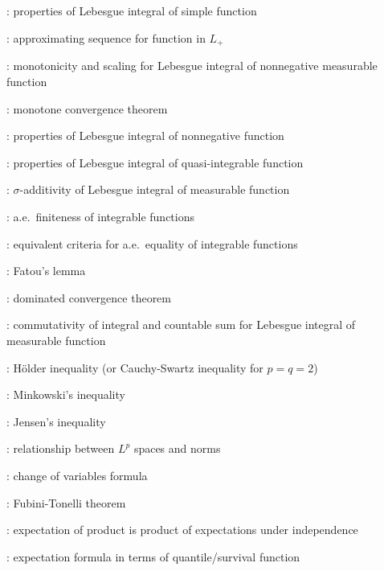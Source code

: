\subsection*{}
\item {}: properties of Lebesgue integral of simple function
\item {}: approximating sequence for function in \(L_{+}\)
\item {}: monotonicity and scaling for Lebesgue integral of nonnegative measurable function
\item {}: monotone convergence theorem
\item {}: properties of Lebesgue integral of nonnegative function
\item {}: properties of Lebesgue integral of quasi-integrable function
\item {}: \(\sigma\)-additivity of Lebesgue integral of measurable function
\item {}: a.e.\ finiteness of integrable functions
\item {}: equivalent criteria for a.e.\ equality of integrable functions
\item {}: Fatou's lemma
\item {}: dominated convergence theorem
\item {}: commutativity of integral and countable sum for Lebesgue integral of measurable function
\item {}: H\"older inequality (or Cauchy-Swartz inequality for \(p=q=2\))
\item {}: Minkowski's inequality
\item {}: Jensen's inequality
\item {}: relationship between \(L^{p}\) spaces and norms
\item {}: change of variables formula
\item {}: Fubini-Tonelli theorem
\item {}: expectation of product is product of expectations under independence
\item {}: expectation formula in terms of quantile/survival function
